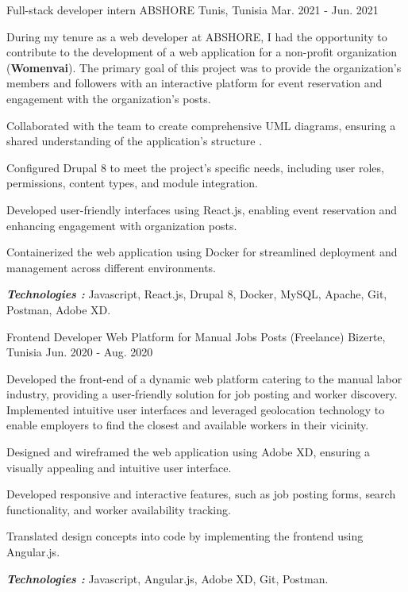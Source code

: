 \begin{cventries}
  \cventry
    {Full-stack developer intern} %
    {ABSHORE} %
    {Tunis, Tunisia} %
    {Mar. 2021 - Jun. 2021} %
    {
      During my tenure as a web developer at ABSHORE, I had the opportunity to contribute to the development of a web application for a non-profit organization (\textbf{Womenvai}). The primary goal of this project was to provide the organization's members and followers with an interactive platform for event reservation and engagement with the organization's posts.
    \vspace{5mm}
    \begin{cvitems}
      \item{Collaborated with the team to create comprehensive UML diagrams, ensuring a shared understanding of the application's structure .}
      \item{Configured Drupal 8 to meet the project's specific needs, including user roles, permissions, content types, and module integration.}
      \item{Developed user-friendly interfaces using React.js, enabling event reservation and enhancing engagement with organization posts.}
      \item {Containerized the web application using Docker for streamlined deployment and management across different environments.}
    \end{cvitems}
    \vspace{5mm}
      \textbf{\textit{Technologies :}} Javascript, React.js, Drupal 8, Docker, MySQL, Apache, Git, Postman, Adobe XD.
    \vspace{5mm}
      }

  \cventry
    {Frontend Developer} %
    {Web Platform for Manual Jobs Posts (Freelance)} %
    {Bizerte, Tunisia} %
    {Jun. 2020 - Aug. 2020} %
    {
      Developed the front-end of a dynamic web platform catering to the manual labor industry, providing a user-friendly solution for job posting and worker discovery. Implemented intuitive user interfaces and leveraged geolocation technology to enable employers to find the closest and available workers in their vicinity.
     \vspace{5mm}
      \begin{cvitems} %
        \item {Designed and wireframed the web application using Adobe XD, ensuring a visually appealing and intuitive user interface.}
        \item {Developed responsive and interactive features, such as job posting forms, search functionality, and worker availability tracking.}
        \item {Translated design concepts into code by implementing the frontend using Angular.js.}
      \end{cvitems}
      \vspace{5mm}
      \textbf{\textit{Technologies :}} Javascript, Angular.js, Adobe XD, Git, Postman.
      \vspace{5mm}
    }


\end{cventries}
